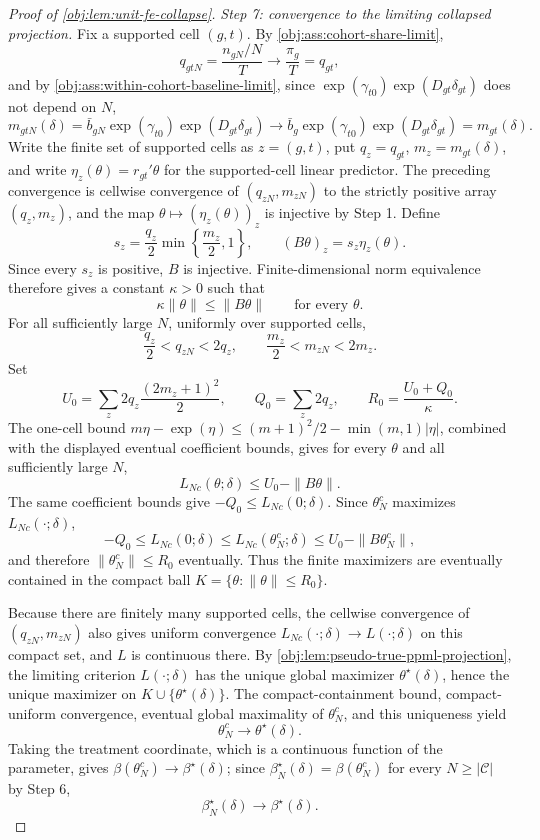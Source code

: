 \documentclass[11pt]{article}
\begin{document}
\begin{proof}[Proof of \cref{obj:lem:unit-fe-collapse}]
\textit{Step 7: convergence to the limiting collapsed projection.} Fix a supported cell \((g,t)\). By \cref{obj:ass:cohort-share-limit},
\[
q_{gtN}=\frac{n_{gN}/N}{T}\longrightarrow \frac{\pi_g}{T}=q_{gt},
\]
and by \cref{obj:ass:within-cohort-baseline-limit}, since \(\exp(\gamma_{t0})\exp(D_{gt}\delta_{gt})\) does not depend on \(N\),
\[
m_{gtN}(\delta)=\bar b_{gN}\exp(\gamma_{t0})\exp(D_{gt}\delta_{gt})
\longrightarrow
\bar b_g\exp(\gamma_{t0})\exp(D_{gt}\delta_{gt})=m_{gt}(\delta).
\]
Write the finite set of supported cells as \(z=(g,t)\), put \(q_z=q_{gt}\), \(m_z=m_{gt}(\delta)\), and write \(\eta_z(\theta)=r_{gt}'\theta\) for the supported-cell linear predictor. The preceding convergence is cellwise convergence of \((q_{zN},m_{zN})\) to the strictly positive array \((q_z,m_z)\), and the map \(\theta\mapsto(\eta_z(\theta))_z\) is injective by Step 1. Define
\[
s_z=\frac{q_z}{2}\min\!\left\{\frac{m_z}{2},1\right\},
\qquad
(B\theta)_z=s_z\eta_z(\theta) .
\]
Since every \(s_z\) is positive, \(B\) is injective. Finite-dimensional norm equivalence therefore gives a constant \(\kappa>0\) such that
\[
\kappa\|\theta\|\le \|B\theta\|
\qquad\text{for every }\theta .
\]
For all sufficiently large \(N\), uniformly over supported cells,
\[
\frac{q_z}{2}<q_{zN}<2q_z,
\qquad
\frac{m_z}{2}<m_{zN}<2m_z .
\]
Set
\[
U_0=\sum_z 2q_z\frac{(2m_z+1)^2}{2},
\qquad
Q_0=\sum_z 2q_z,
\qquad
R_0=\frac{U_0+Q_0}{\kappa}.
\]
The one-cell bound \(m\eta-\exp(\eta)\le (m+1)^2/2-\min(m,1)|\eta|\), combined with the displayed eventual coefficient bounds, gives for every \(\theta\) and all sufficiently large \(N\),
\[
L_{Nc}(\theta;\delta)\le U_0-\|B\theta\|.
\]
The same coefficient bounds give \(-Q_0\le L_{Nc}(0;\delta)\). Since \(\theta_N^c\) maximizes \(L_{Nc}(\cdot;\delta)\),
\[
-Q_0\le L_{Nc}(0;\delta)
\le L_{Nc}(\theta_N^c;\delta)
\le U_0-\|B\theta_N^c\|,
\]
and therefore \(\|\theta_N^c\|\le R_0\) eventually. Thus the finite maximizers are eventually contained in the compact ball \(K=\{\theta:\|\theta\|\le R_0\}\).

Because there are finitely many supported cells, the cellwise convergence of \((q_{zN},m_{zN})\) also gives uniform convergence \(L_{Nc}(\cdot;\delta)\to L(\cdot;\delta)\) on this compact set, and \(L\) is continuous there. By \cref{obj:lem:pseudo-true-ppml-projection}, the limiting criterion \(L(\cdot;\delta)\) has the unique global maximizer \(\theta^\star(\delta)\), hence the unique maximizer on \(K\cup\{\theta^\star(\delta)\}\). The compact-containment bound, compact-uniform convergence, eventual global maximality of \(\theta_N^c\), and this uniqueness yield
\[
\theta_N^c\longrightarrow\theta^\star(\delta).
\]
Taking the treatment coordinate, which is a continuous function of the parameter, gives \(\beta(\theta_N^c)\to\beta^\star(\delta)\); since \(\beta_N^\star(\delta)=\beta(\theta_N^c)\) for every \(N\ge|\mathcal C|\) by Step 6,
\[
\beta_N^\star(\delta)\longrightarrow\beta^\star(\delta).
\]


\end{proof}
\end{document}
